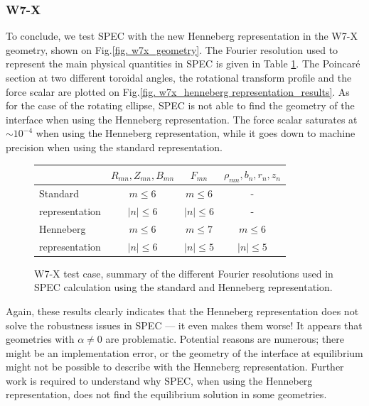 \documentclass[my_thesis.tex]{subfiles}
\begin{document}
\subsubsection{W7-X}
To conclude, we test SPEC with the new Henneberg representation in the W7-X geometry, shown on Fig.\ref{fig. w7x_geometry}. The Fourier resolution used to represent the main physical quantities in SPEC is given in Table \ref{tab. w7x res}. The Poincar\'e section at two different toroidal angles, the rotational transform profile and the force scalar are plotted on Fig.\ref{fig. w7x_henneberg representation_results}. As for the case of the rotating ellipse, SPEC is not able to find the geometry of the interface when using the Henneberg representation. The force scalar saturates at $\sim 10^{-4}$ when using the Henneberg representation, while it goes down to machine precision when using the standard representation.  


\begin{figure}
	\centering
	\begin{tabular}{l|c|c|c|}
		    & $R_{mn},Z_{mn},B_{mn}$ & $F_{mn}$ & $\rho_{mn},b_n,r_n,z_n$ \\
		\hline
		Standard &  $m\leq 6$ & $m\leq 6$ & - \\
		representation	& $|n|\leq 6$ & $|n|\leq 6$ & - \\
		\hline
		Henneberg & $m\leq 6$ & $m\leq 7$ & $m\leq 6$\\
		representation & $|n|\leq 6$ & $|n|\leq 5$ & $|n|\leq 5$
	\end{tabular}
	\caption{W7-X test case, summary of the different Fourier resolutions used in SPEC calculation using the standard and Henneberg representation.}
	\label{tab. w7x res}
\end{figure}

Again, these results clearly indicates that the Henneberg representation does not solve the robustness issues in SPEC --- it even makes them worse! It appears that geometries with $\alpha\neq 0$ are problematic. Potential reasons are numerous; there might be an implementation error, or the geometry of the interface at equilibrium might not be possible to describe with the Henneberg representation. Further work is required to understand why SPEC, when using the Henneberg representation, does not find the equilibrium solution in some geometries. 
\end{document}
